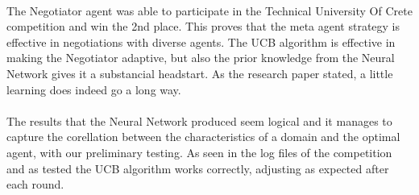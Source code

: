 \paragraph{}
 The Negotiator agent was able to participate in the Technical University Of Crete competition and win the 2nd place. This proves that the meta agent strategy is effective in negotiations with diverse agents.
The UCB algorithm is effective in making the Negotiator adaptive, but also the prior knowledge from the Neural Network gives it a substancial headstart. As the research paper 
\cite{meta_agent_paper} stated, a little learning does indeed go a long way.
\paragraph{}
The results that the Neural Network produced seem logical and it manages to capture the corellation between the characteristics of a domain and the optimal agent, with our preliminary testing. As seen in the log files
of the competition and as tested the UCB algorithm works correctly, adjusting as expected after each round.

 